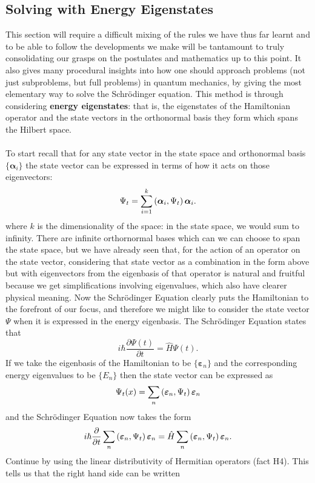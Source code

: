 \subsection{Solving with Energy Eigenstates}
This section will require a difficult mixing of the rules we have thus far learnt and to be able to follow the developments we make will be tantamount to truly consolidating our grasps on the postulates and mathematics up to this point. It also gives many procedural insights into how one should approach problems (not just subproblems, but full problems) in quantum mechanics, by giving the most elementary way to solve the Schr\"{o}dinger equation. This method is through considering \textbf{energy eigenstates}: that is, the eigenstates of the Hamiltonian operator and the state vectors in the orthonormal basis they form which spans the Hilbert space. 
\\\\
To start recall that for any state vector in the state space and orthonormal basis $\{\bm{\alpha}_{i}\}$ the state vector can be expressed in terms of how it acts on those eigenvectors:
$$
\Psi_{t}=\sum_{i=1}^{k}\left(\bm{\alpha}_{i},\Psi_{t}\right)\bm{\alpha}_{i}.
$$
where $k$ is the dimensionality of the space: in the state space, we would sum to infinity. There are infinite orthornormal bases which can we can choose to span the state space, but we have already seen that, for the action of an operator on the state vector, considering that state vector as a combination in the form above but with eigenvectors from the eigenbasis of that operator is natural and fruitful because we get simplifications involving eigenvalues, which also have clearer physical meaning. Now the Schr\"{o}dinger Equation clearly puts the Hamiltonian to the forefront of our focus, and therefore we might like to consider the state vector $\Psi$ when it is expressed in the energy eigenbasis. The Schr\"{o}dinger Equation states that 
$$
i\hbar\frac{\partial \Psi(t)}{\partial t}=\hat{H}\Psi(t).
$$
If we take the eigenbasis of the Hamiltonian to be $\{\bm{\bm{\varepsilon}}_{n}\}$ and the corresponding energy eigenvalues to be $\{E_{n}\}$ then the state vector can be expressed as
$$
\Psi_{t}(x)=\sum_{n}\left(\bm{\varepsilon}_{n},\Psi_{t}\right)\bm{\varepsilon}_{n}
$$
and the Schr\"{o}dinger Equation now takes the form 
$$i\hbar\frac{\partial}{\partial t}\sum_{n}\left(\bm{\varepsilon}_{n},\Psi_{t}\right)\bm{\varepsilon}_{n}=\hat{H}\sum_{n}\left(\bm{\varepsilon}_{n},\Psi_{t}\right)\bm{\varepsilon}_{n}.
$$
Continue by using the linear distributivity of Hermitian operators (fact H4). This tells us that the right hand side can be written 
